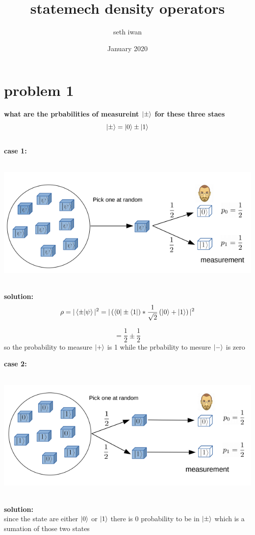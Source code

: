 \documentclass{article}
\title{statemech density operators}
\author{seth iwan }
\date{January 2020}
\newcommand{\nm}{\begin{equation}}
\newcommand{\enm}{\end{equation}}
\newcommand{\lp}{\left(}
\newcommand{\rp}{\right)}
\begin{document}
\maketitle
\section{problem 1}
\textbf{what are the prbabilities of measureint $\ket{\pm}$ for these three staes}\\ 
\nm
\ket{\pm}=\ket{0}\pm\ket{1}
\enm
\\
\textbf{case 1:}\\
\\
\centerline{ \includegraphics[scale=.5]{images-for-density-operator/case1.png}}\\
\textbf{solution:}\\
	\nm
	\rho = | \bra{\pm}\ket{\psi} |^2= |\lp\bra{0}\pm\bra{1}\rp *\frac{1}{\sqrt{2}} \lp\ket{0}+\ket{1}\rp|^2
	\enm
	
	\nm
	= \frac{1}{2} \pm \frac{1}{2}
	\enm
so the probability to measure $\ket{+}$ is 1 while the prbability to mesure $\ket{-}$ is zero

\textbf{case 2:}\\
\\
\centerline{ \includegraphics[scale=.5]{images-for-density-operator/case2.png}}\\
\textbf{solution:}\\
	since the state are either $\ket{0}$ or $\ket{1}$ there is 0 probability to be in $\ket{\pm}$ which is a sumation of those two states\\
\\
\end{document}
